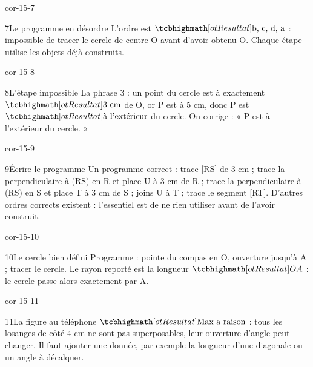 \begin{blocLivre}{cor-15-7}\begin{corrige}{7}{Le programme en désordre}
L’ordre est $\res{\text{b, c, d, a}}$ : impossible de tracer le cercle de centre O avant d’avoir obtenu O. Chaque étape utilise les objets déjà construits.
\label{fig-cor-15-7}
\end{corrige}\end{blocLivre}
\begin{blocLivre}{cor-15-8}\begin{corrige}{8}{L’étape impossible}
La phrase 3 : un point du cercle est à exactement $\res{3\ \mathrm{cm}}$ de O, or P est à 5 cm, donc P est $\res{\text{à l’extérieur}}$ du cercle. On corrige : « P est à l’extérieur du cercle. »
\label{fig-cor-15-8}
\end{corrige}\end{blocLivre}
\begin{blocLivre}{cor-15-9}\begin{corrige}{9}{Écrire le programme}
Un programme correct : trace [RS] de 3 cm ; trace la perpendiculaire à (RS) en R et place U à 3 cm de R ; trace la perpendiculaire à (RS) en S et place T à 3 cm de S ; joins U à T ; trace le segment [RT]. D’autres ordres corrects existent : l’essentiel est de ne rien utiliser avant de l’avoir construit.
\label{fig-cor-15-9}
\end{corrige}\end{blocLivre}
\begin{blocLivre}{cor-15-10}\begin{corrige}{10}{Le cercle bien défini}
Programme : pointe du compas en O, ouverture jusqu’à A ; tracer le cercle. Le rayon reporté est la longueur $\res{OA}$ : le cercle passe alors exactement par A.
\label{fig-cor-15-10}
\end{corrige}\end{blocLivre}
\begin{blocLivre}{cor-15-11}\begin{corrige}{11}{La figure au téléphone}
$\res{\text{Max a raison}}$ : tous les losanges de côté 4 cm ne sont pas superposables, leur ouverture d’angle peut changer. Il faut ajouter une donnée, par exemple la longueur d’une diagonale ou un angle à décalquer.
\label{fig-cor-15-11}
\end{corrige}\end{blocLivre}
